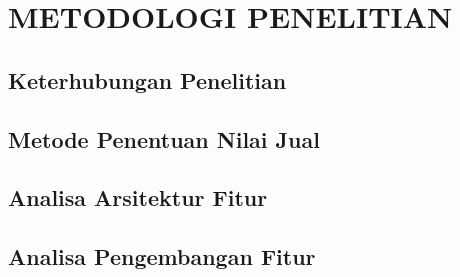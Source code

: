 
\chapter{METODOLOGI PENELITIAN}

\section{Keterhubungan Penelitian}

\section{Metode Penentuan Nilai Jual}

\section{Analisa Arsitektur Fitur}

\section{Analisa Pengembangan Fitur}





